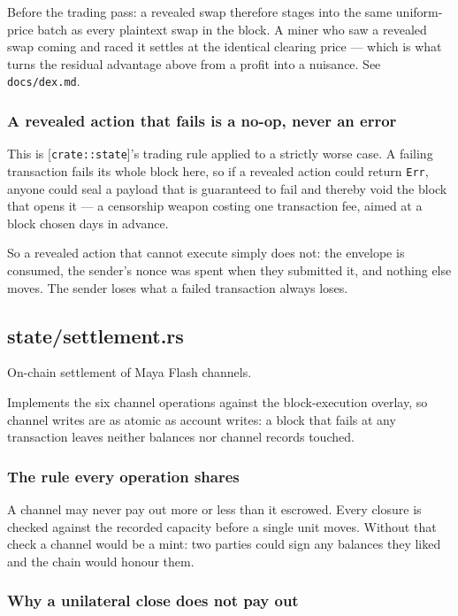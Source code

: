 \documentclass[11pt,a4paper]{article}
\begin{document}
Before the trading pass: a revealed swap therefore stages into the same
uniform-price batch as every plaintext swap in the block. A miner who saw a
revealed swap coming and raced it settles at the identical clearing price —
which is what turns the residual advantage above from a profit into a
nuisance. See \texttt{docs/dex.md}.

\subsubsection{A revealed action that fails is a no-op, never an error}

This is [\texttt{crate::state}]'s trading rule applied to a strictly worse case. A
failing transaction fails its whole block here, so if a revealed action
could return \texttt{Err}, anyone could seal a payload that is guaranteed to fail
and thereby void the block that opens it — a censorship weapon costing one
transaction fee, aimed at a block chosen days in advance.

So a revealed action that cannot execute simply does not: the envelope is
consumed, the sender's nonce was spent when they submitted it, and nothing
else moves. The sender loses what a failed transaction always loses.

\subsection{state/settlement.rs}
On-chain settlement of Maya Flash channels.

Implements the six channel operations against the block-execution overlay,
so channel writes are as atomic as account writes: a block that fails at any
transaction leaves neither balances nor channel records touched.

\subsubsection{The rule every operation shares}

A channel may never pay out more or less than it escrowed. Every closure is
checked against the recorded capacity before a single unit moves. Without
that check a channel would be a mint: two parties could sign any balances
they liked and the chain would honour them.

\subsubsection{Why a unilateral close does not pay out}
\end{document}
